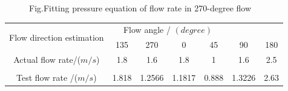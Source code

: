 \begin{figure}[!htp]
\centering
{}
\hspace{1in}
\label{fig:chap3:F19}
 {Fig.}{Fitting pressure equation of flow rate in 270-degree flow }
\end{figure}



\begin{table}[!htbp]
  \centering
  \label{table:chap3:verification}
  \begin{tabular}{ccccccc}
  \toprule
  \multirow{2}{*}{Flow direction estimation} & \multicolumn{4}{c}{Flow angle / $\left (degree\right )$} \\
                           &135    &270    &0      & 45    &90    &180 \\
  \midrule
  Actual flow rate/($m/s$) &1.8    &1.6    &1.8    &1      &1.6    &2.5 \\
      \\
  Test flow rate /($m/s$)  & 1.818 &1.2566 &1.1817 &0.888  &1.3226 &2.63 \\
  \bottomrule
  \end{tabular}%
\end{table}%

